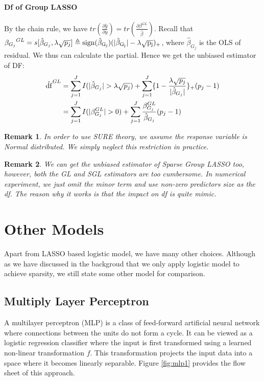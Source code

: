 \documentclass[]{article}
\newtheorem{remark}{Remark}
\begin{document}
\paragraph{Df of Group LASSO}
By the chain rule, we have $ tr(\frac{\partial \hat{y}}{\partial y})=tr(\frac{\partial \beta^{GL}}{\hat{\beta}}) $. Recall that $ {\beta_{G_j}}^{GL}=s[\hat{\beta}_{G_j},\lambda\sqrt{p_j}]\triangleq \rm sign(\hat{\beta}_{G_j})(|\hat{\beta}_{G_j}|-\lambda\sqrt{p_j})_+ $, where $\hat{\beta}_{G_j}$ is the OLS of residual. We thus can calculate the partial. Hence we get the unbiased estimator of DF:
\begin{align}
	\hat{\rm df}^{GL}&=\sum_{j=1}^J I(|\hat{\beta}_{G_j}|>\lambda\sqrt{p_j})+\sum_{j=1}^J\{1-\frac{\lambda\sqrt{p_j}}{|\hat{\beta}_{G_j}|}\}_{+}(p_j-1)\\
				&=\sum_{j=1}^J I(|\beta_{G_j}^{GL}|>0)+\sum_{j=1}^J \frac{\beta_{G_j}^{GL}}{\hat{\beta}_{G_j}}(p_j-1)
\end{align}
\begin{remark}
	In order to use SURE theory, we assume the response variable is Normal distributed. We simply neglect this restriction in practice.
\end{remark}
\begin{remark}
	We can get the unbiased estimator of Sparse Group LASSO too, however, both the GL and SGL estimators are too cumbersome. In numerical experiment, we just omit the minor term and use non-zero predictors size as the df. The reason why it works is that the impact on df is quite mimic.
\end{remark}
\section{Other Models}
Apart from LASSO based logistic model, we have many other choices. Although as we have discussed in the backgroud that we only apply logistic model to achieve sparsity, we still state some other model for comparison.
\subsection{Multiply Layer Perceptron}
A multilayer perceptron\cite{gardner1998artificial} (MLP) is a class of feed-forward artificial neural network where connections between the units do not form a cycle. It can be viewed as a logistic regression classifier where the input is first transformed using a learned non-linear transformation \textbf{$ f $}. This transformation projects the input data into a space where it becomes linearly separable. Figure \ref{fig:mlp1} provides the flow sheet of this approach.
\end{document}
